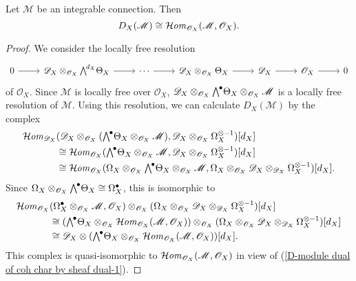 \begin{proposition}\label{D-module dual of coh char by sheaf dual}
Let $\mathscr{M}$ be an integrable connection. Then
\[D_X(\mathscr{M})\cong \operatorname{\mathcal{H}\hspace*{-0.4pt}\textit{om}\hspace{0.5pt}}_{\mathscr{O}_X}(\mathscr{M},\mathscr{O}_X).\]
\end{proposition}
\begin{proof}
We consider the locally free resolution
\begin{equation}\label{D-module dual of coh char by sheaf dual-1}
\begin{tikzcd}
0\ar[r]&\mathscr{D}_X\otimes_{\mathscr{O}_X}\bigw^{d_X}\Theta_X\ar[r]&\cdots\ar[r]&\mathscr{D}_X\otimes_{\mathscr{O}_X}\Theta_X\ar[r]&\mathscr{D}_X\ar[r]&\mathscr{O}_X\ar[r]&0
\end{tikzcd}
\end{equation}
of $\mathscr{O}_X$. Since $\mathscr{M}$ is locally free over $\mathscr{O}_X$, $\mathscr{D}_X\otimes_{\mathscr{O}_X}\bigw^\bullet\Theta_X\otimes_{\mathscr{O}_X}\mathscr{M}$ is a locally free resolution of $\mathscr{M}$. Using this resolution, we can calculate $D_X(\mathscr{M})$ by the complex
\begin{align*}
\sHom_{\mathscr{D}_X}&(\mathscr{D}_X\otimes_{\mathscr{O}_X}(\bigw^\bullet\Theta_X\otimes_{\mathscr{O}_X}\mathscr{M}),\mathscr{D}_X\otimes_{\mathscr{O}_X}\Omega_X^{\otimes-1})[d_X]\\
&\cong \sHom_{\mathscr{O}_X}(\bigw^\bullet\Theta_X\otimes_{\mathscr{O}_X}\mathscr{M},\mathscr{D}_X\otimes_{\mathscr{O}_X}\Omega_X^{\otimes-1})[d_X]\\
&\cong \sHom_{\mathscr{O}_X}(\Omega_X\otimes_{\mathscr{O}_X}\bigw^\bullet\Theta_X\otimes_{\mathscr{O}_X}\mathscr{M},\Omega_X\otimes_{\mathscr{O}_X}\mathscr{D}_X\otimes_{\mathscr{D}_X}\Omega_X^{\otimes-1})[d_X].
\end{align*}
Since $\Omega_X\otimes_{\mathscr{O}_X}\bigw^\bullet\Theta_X\cong\Omega_X^\bullet$, this is isomorphic to
\begin{align*}
\sHom_{\mathscr{O}_X}&(\Omega_X^\bullet\otimes_{\mathscr{O}_X}\mathscr{M},\mathscr{O}_X)\otimes_{\mathscr{O}_X}(\Omega_X\otimes_{\mathscr{O}_X}\mathscr{D}_X\otimes_{\mathscr{D}_X}\Omega_X^{\otimes-1})[d_X]\\
&\cong (\bigw^\bullet\Theta_X\otimes_{\mathscr{O}_X}\sHom_{\mathscr{O}_X}(\mathscr{M},\mathscr{O}_X))\otimes_{\mathscr{O}_X}(\Omega_X\otimes_{\mathscr{O}_X}\mathscr{D}_X\otimes_{\mathscr{D}_X}\Omega_X^{\otimes-1})[d_X]\\
&\cong \mathscr{D}_X\otimes(\bigw^\bullet\Theta_X\otimes_{\mathscr{O}_X}\sHom_{\mathscr{O}_X}(\mathscr{M},\mathscr{O}_X))[d_X].
\end{align*}
This complex is quasi-isomorphic to $\operatorname{\mathcal{H}\hspace*{-0.4pt}\textit{om}\hspace{0.5pt}}_{\mathscr{O}_X}(\mathscr{M},\mathscr{O}_X)$ in view of (\ref{D-module dual of coh char by sheaf dual-1}).
\end{proof}

